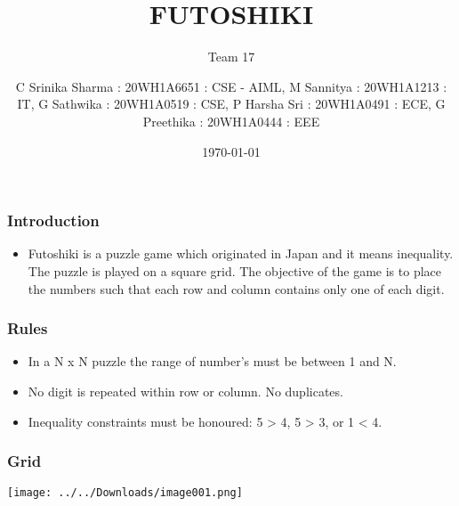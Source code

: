 \documentclass[14pt]{beamer}
\title{FUTOSHIKI}
\subtitle{Team 17}
\date{\today}
\author[14pt]{C Srinika Sharma : 20WH1A6651 : CSE - AIML, M Sannitya : 20WH1A1213 : IT, G Sathwika : 20WH1A0519 : CSE, P Harsha Sri : 20WH1A0491 : ECE, G Preethika : 20WH1A0444 : EEE}
\begin{document}
  
  \begin{frame}
        \titlepage
    \end{frame}
  
  \begin{frame}
	\frametitle{Introduction}
        
	\begin{itemize}
	    \item Futoshiki is a puzzle game which originated in Japan and it means inequality. The puzzle is played on a square grid. The objective of the game is to place the numbers such that each row and column contains only one of each digit.
	\end{itemize}
	
  \end{frame}
   \begin{frame}
	\frametitle{Rules}

	\begin{itemize}
	    \item In a N x N puzzle the range of number's must be between 1 and N.  
	\end{itemize}

	\begin{itemize}
	    \item No digit is repeated within row or column. No duplicates. 
	\end{itemize}

	\begin{itemize}
	    \item Inequality constraints must be honoured: 5 > 4, 5 > 3, or 1 < 4.
	\end{itemize}
  \end{frame}
 \begin{frame}
	\frametitle{Grid}
        
	\texttt{[image: ../../Downloads/image001.png]}
	
  \end{frame}
   
 
\end{document}
